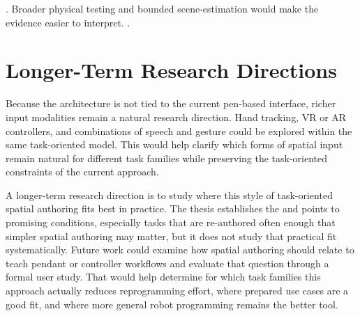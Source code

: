 \DIFdelbegin {}\DIFdelend \DIFaddbegin {}\DIFaddend . Broader physical testing and bounded \DIFdelbegin {}\DIFdelend \DIFaddbegin {}\DIFaddend scene-estimation \DIFdelbegin {}\DIFdelend \DIFaddbegin {}\DIFaddend would make the \DIFdelbegin {}\DIFdelend \DIFaddbegin {}\DIFaddend evidence easier to interpret. \DIFdelbegin {}\DIFdelend \DIFaddbegin {}\DIFaddend .

\section{Longer-Term Research Directions}

Because the architecture is not tied to the current pen-based interface, richer input modalities remain a natural research direction. Hand tracking, VR or AR controllers, and combinations of speech and gesture could be explored within the same task-oriented model. This would help clarify which forms of spatial input remain natural for different task families while preserving the task-oriented constraints of the current approach.

A longer-term research direction is to study where this style of task-oriented spatial authoring fits best in practice. The thesis establishes the \DIFdelbegin {}\DIFdelend \DIFaddbegin {}\DIFaddend and points to promising conditions, especially tasks that are re-authored often enough that simpler spatial authoring may matter, but it does not study that practical fit systematically. Future work could examine how spatial authoring should relate to teach pendant or controller workflows and evaluate that question through a formal user study. That would help determine for which task families this approach actually reduces reprogramming effort, where prepared use cases are a good fit, and where more general robot programming remains the better tool.

